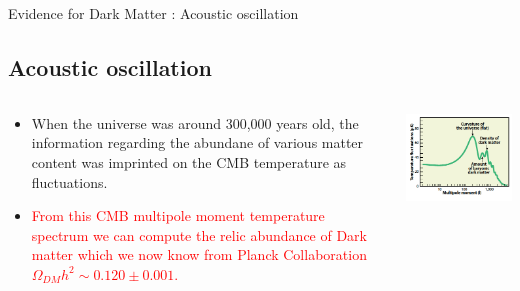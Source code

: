 \documentclass[11pt]{beamer}
\begin{document}
%
%
%

\begin{frame}{Evidence for Dark Matter : Acoustic oscillation}
\subsection{Acoustic oscillation}

\begin{columns}
\begin{column}{0.6\textwidth}
\begin{itemize}
\item When the universe was around 300,000 years old, the information regarding the abundane of various matter content was imprinted on the CMB temperature as fluctuations.
\item \textcolor{red}{ From this CMB multipole moment temperature spectrum we can compute the relic abundance of Dark matter which we now know from Planck Collaboration $\Omega_{DM} h^2 \sim 0.120 \pm 0.001$.}
\end{itemize}

\end{column}


\begin{column}{0.5\textwidth}
\includegraphics[scale=0.5]{cmb.png}
\end{column}

\end{columns}

\end{frame}
\end{document}

